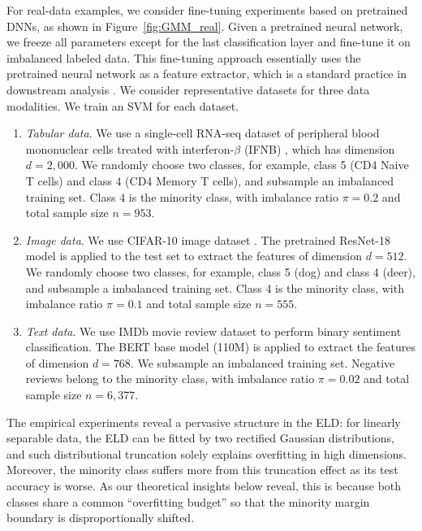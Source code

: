 For real-data examples, we consider fine-tuning experiments based on pretrained DNNs, as shown in Figure~\ref{fig:GMM_real}. Given a pretrained neural network, we freeze all parameters except for the last classification layer and fine-tune it on imbalanced labeled data. This fine-tuning approach essentially uses the pretrained neural network as a feature extractor, which is a standard practice in downstream analysis \cite{zhou2016learning, sharif2014cnn, radford2021learning, howard2018universal}.  We consider representative datasets for three data modalities. We train an SVM for each dataset.
\begin{enumerate}
    \item \textit{Tabular data}. We use a single-cell RNA-seq dataset of peripheral blood mononuclear cells treated with interferon-$\beta$ (IFNB) \cite{ifnb}, which has dimension $d = 2,000$. We randomly choose two classes, for example, class 5 (CD4 Naive T cells) and class 4 (CD4 Memory T cells), and subsample an imbalanced training set. Class 4 is the minority class, with imbalance ratio $\pi = 0.2$ and total sample size $n = 953$. %
    \item \textit{Image data}. We use CIFAR-10 image dataset \cite{KrizhevskyCIFAR102009}. The pretrained ResNet-18 model \cite{resnet, ResNet18_CIFAR10} is applied to the test set to extract the features of dimension $d = 512$. We randomly choose two classes, for example, class 5 (dog) and class 4 (deer), and subsample a imbalanced training set. Class 4 is the minority class, with imbalance ratio $\pi = 0.1$ and total sample size $n = 555$. %
    \item \textit{Text data}. We use IMDb movie review dataset \cite{IMDB} to perform binary sentiment classification. The BERT base model (110M) \cite{BERT} is applied to extract the features of dimension $d = 768$. We subsample an imbalanced training set. Negative reviews belong to the minority class, with imbalance ratio $\pi = 0.02$ and total sample size $n = 6,377$. %
\end{enumerate}



The empirical experiments reveal a pervasive structure in the ELD: for linearly separable data, the ELD can be fitted by two rectified Gaussian distributions, and such distributional truncation solely explains overfitting in high dimensions. Moreover, the minority class suffers more from this truncation effect as its test accuracy is worse. As our theoretical insights below reveal, this is because both classes share a common ``overfitting budget'' so that the minority margin boundary is disproportionally shifted.


